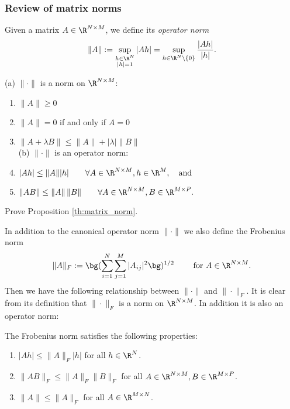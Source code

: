 \subsubsection{Review of matrix norms}
%
\label{sec:matrix_norms}
%
Given a matrix $A \in \R^{N \times M}$, we define its {\em operator
  norm}
\begin{equation}
  \label{eq:defn_matrix_norm}
  \| A \| := \sup_{\substack{h \in \R^N \\ |h| = 1}} |A h| = \sup_{h
    \in \R^N \setminus \{0\}} \frac{|Ah|}{|h|}.
\end{equation}

\begin{proposition}
  \label{th:matrix_norm}
  (a) $\|\cdot\|$ is a norm on $\R^{N \times M}$:
  \begin{enumerate}\ilist
  \item $\| A \| \geq 0$
  \item $\| A \| = 0$ if and only if $A = 0$
  \item $\| A + \lambda B \| \leq \| A \| + |\lambda| \| B \|$ \\

  (b) $\|\cdot\|$ is an operator norm:
\item $| A h | \leq \| A \| |h| \qquad \forall A \in \R^{N \times M}, h
  \in \R^M, \quad \text{and}$
\item $\| A B \| \leq \| A \| \, \| B \| \qquad \forall A \in \R^{N
    \times M}, B \in \R^{M \times P}.$
  \end{enumerate}
\end{proposition}
\begin{exercise}
  Prove Proposition \ref{th:matrix_norm}.
\end{exercise}


In addition to the canonical operator norm $\|\cdot\|$ we also define
the Frobenius norm
\begin{displaymath}
  \| A \|_F := \bg(\sum_{i = 1}^N \sum_{j = 1}^M |A_{ij}|^2 \bg)^{1/2}
  \qquad \text{ for } A \in \R^{N \times M}.
\end{displaymath}
Then we have the following relationship between $\|\cdot\|$ and
$\|\cdot\|_F$. It is clear from its definition that $\|\cdot\|_F$ is a
norm on $\R^{N \times M}$. In addition it is also an operator norm:

\begin{lemma}
  \label{th:opnrm_vs_frobnrm}
  The Frobenius norm satisfies the following properties:
  \begin{enumerate} \ilist
  \item  $|A h | \leq \|A\|_F |h|$ for all $h \in \R^N$.

  \item $\| A B \|_F \leq \|A \|_F \| B \|_F$ for all $A \in \R^{N
      \times M}, B \in \R^{M \times P}$.

  \item $\|A\| \leq \|A\|_F$ for all $A \in \R^{M \times N}$.
\end{enumerate}
\end{lemma}


